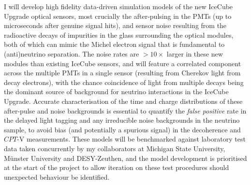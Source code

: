 \documentclass[a4paper,11pt]{article}
\newcounter{bar}
\begin{document}
I will develop high fidelity data-driven simulation models of the new IceCube Upgrade optical sensors, most crucially the after-pulsing in the PMTs (up to microseconds after genuine signal hits), and sensor noise resulting from the radioactive decays of impurities in the glass surrounding the optical modules, both of which can mimic the Michel electron signal that is fundamental to (anti)neutrino separation. The noise rates are $>10 \times$ larger in these new modules than existing IceCube sensors, and will feature a correlated component across the multiple PMTs in a single sensor (resulting from Cherekov light from decay electrons), with the chance coincidence of light from multiple decays being the dominant source of background for neutrino interactions in the IceCube Upgrade. Accurate characterisation of the time and charge distributions of these after-pulse and noise backgrounds is essential to quantify the \textit{false positive} rate in the delayed light tagging and any irreducible noise backgrounds in the neutrino sample, to avoid bias (and potentially a spurious signal) in the decoherence and $CPT$-V measurements. These models will be benchmarked against laboratory test data taken concurrently by my collaborators at Michigan State University, M{\"u}nster University and DESY-Zeuthen, and the model development is prioritised at the start of the project to allow iteration on these test procedures should unexpected behaviour be identified.


\end{document}
